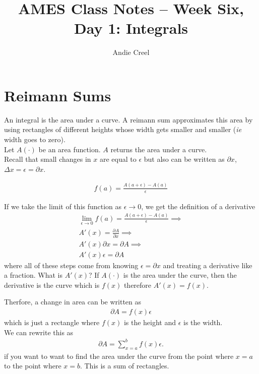 \documentclass{article}
\title{AMES Class Notes -- Week Six, Day 1: Integrals}
\author{Andie Creel}
\begin{document}
\maketitle


\section{Reimann Sums}
An integral is the area under a curve. A reimann sum approximates this area by using rectangles of different heights whose width gets smaller and smaller (\textit{ie} width goes to zero).\\

Let $A(\cdot)$ be an area function. $A$ returns the area under a curve. \\

Recall that small changes in $x$ are equal to $\epsilon$ but also can be written as $\partial x$, $\Delta x = \epsilon = \partial x$.

\begin{align}
    f(a) = \frac{A(a+\epsilon)-A(a)}{\epsilon}
\end{align}

If we take the limit of this function as $\epsilon \to 0$, we get the definition of a derivative 
\begin{align}
    \lim_{\epsilon \to 0} f(a) = \frac{A(a+\epsilon)-A(a)}{\epsilon} \implies\\
    A'(x) = \frac{\partial A}{\partial x} \implies \\
    A'(x) \partial x = \partial A \implies \\
    A'(x) \epsilon = \partial A 
\end{align}
where all of these steps come from knowing $\epsilon = \partial x$ and treating a derivative like a fraction. What is $A'(x)$? If $A(\cdot)$ is the area under the curve, then the derivative is the curve which is $f(x)$ therefore $A'(x) = f(x)$. 

Therfore, a change in area can be written as
\begin{align}
    \partial A = f(x) \epsilon
\end{align}
which is just a rectangle where $f(x)$ is the height and $\epsilon$ is the width. \\

We can rewrite this as 
\begin{align}
    \partial A =  \sum_{x=a}^{b}f(x) \epsilon.
\end{align}
if you want to want to find the area under the curve from the point where $x =a $ to the point where $x = b$. This is a sum of rectangles. \\
\end{document}
